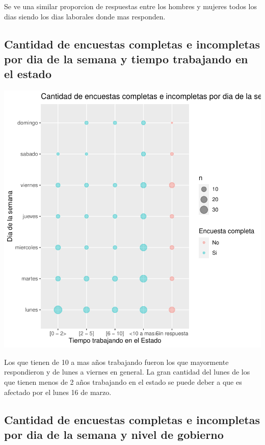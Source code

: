 \documentclass{article}
\begin{document}
Se ve una similar proporcion de respuestas entre los hombres y mujeres todos los dias siendo los dias laborales donde mas responden.

\subsection{Cantidad de encuestas completas e incompletas por dia de la semana y tiempo trabajando en el estado}

\includegraphics{seguimientov3-085}

Los que tienen de 10 a mas años trabajando fueron los que mayormente respondieron y de lunes a viernes en general. La gran cantidad del lunes de los que tienen menos de 2 años trabajando en el estado se puede deber a que es afectado por el lunes 16 de marzo. 

\subsection{Cantidad de encuestas completas e incompletas por dia de la semana y nivel de gobierno}
\end{document}
